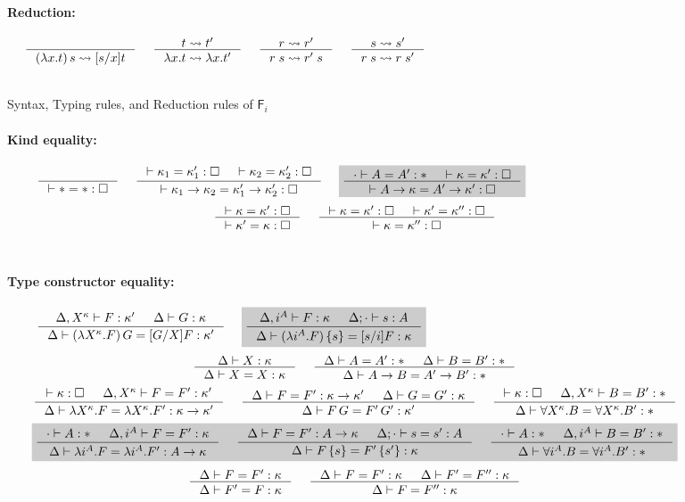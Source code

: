 \documentclass[preprint]{sigplanconf}
\newcommand{\newFi}[1]{\colorbox{grey}{\ensuremath{#1}}}
\newcommand{\Fi}{\ensuremath{\mathsf{F}_i}}
\theoremstyle{plain}
\theoremstyle{remark}
\theoremstyle{definition}
\begin{document}
\begin{figure*}
\paragraph{Reduction:} 
$ 
 ~~~~
   \inference{}{(\lambda x.t)\,s \rightsquigarrow [s/x]t}
 ~~~~
   \inference{t \rightsquigarrow t'}{\lambda x.t \rightsquigarrow \lambda x.t'}
 ~~~~
   \inference{r \rightsquigarrow r'}{r\;s \rightsquigarrow r'\;s}
 ~~~~
   \inference{s \rightsquigarrow s'}{r\;s \rightsquigarrow r\;s'}
$
~\\ ~\\
\caption{Syntax, Typing rules, and Reduction rules of \Fi}
\label{fig:Fi}
\end{figure*}

\begin{figure*}
\paragraph{Kind equality:} 
$ \quad
 ~~~~
   \inference{}{|- * = *:\square}
 ~~~~
   \inference{ |- \kappa_1 = \kappa_1' : \square
             & |- \kappa_2 = \kappa_2' : \square }
             {|- \kappa_1 -> \kappa_2 = \kappa_1' -> \kappa_2' : \square}
 ~~~~ \newFi{
   \inference{\cdot |- A=A':* & |- \kappa=\kappa':\square}
             {|- A -> \kappa = A' -> \kappa' : \square} }
$
\[ \inference{|- \kappa=\kappa':\square}
             {|- \kappa'=\kappa:\square}
 ~~~~
   \inference{ |- \kappa =\kappa' :\square
             & |- \kappa'=\kappa'':\square}
             {|- \kappa=\kappa'':\square}
\]
~\\
\paragraph{Type constructor equality:} 
$ \quad
 ~~~~
   \inference{\Delta,X^\kappa |- F:\kappa' & \Delta |- G:\kappa}
             {\Delta |- (\lambda X^\kappa.F)\,G = [G/X]F:\kappa'}
 ~~~~ \newFi{
   \inference{\Delta,i^A |- F:\kappa & \Delta;\cdot |- s:A}
             {\Delta |- (\lambda i^A.F)\,\{s\} = [s/i]F:\kappa} }
$
\[ \inference{\Delta |- X:\kappa }{\Delta |- X=X:\kappa}
 ~~~~
   \inference{\Delta |- A=A':* & \Delta |- B=B':*}{\Delta |- A-> B=A'-> B':*}
\]
\[ \inference{|- \kappa:\square & \Delta,X^\kappa |- F=F' : \kappa'}
             {\Delta |- \lambda X^\kappa.F=\lambda X^\kappa.F':\kappa-> \kappa'}
 ~~~~
   \inference{\Delta |- F=F':\kappa->\kappa' & \Delta |- G=G':\kappa}
             {\Delta |- F\,G = F'\,G' : \kappa'}
 ~~~~
   \inference{|- \kappa:\square & \Delta,X^\kappa |- B=B':*}
             {\Delta |- \forall X^\kappa.B=\forall X^\kappa.B':*}
\]
\[ \newFi{
   \inference{\cdot |- A:* & \Delta,i^A |- F=F' : \kappa}
             {\Delta |- \lambda i^A.F=\lambda i^A.F' : A -> \kappa}
 ~~~~
   \inference{\Delta |- F=F':A->\kappa & \Delta;\cdot |- s=s':A}
             {\Delta |- F\,\{s\} = F'\,\{s'\} : \kappa}
 ~~~~
   \inference{\cdot |- A:* & \Delta,i^A |- B=B':*}
             {\Delta |- \forall i^A.B=\forall i^A.B':*} }
\]
\[ \inference{\Delta |- F = F' : \kappa}{\Delta |- F' = F : \kappa}
 ~~~~
   \inference{\Delta |- F = F' : \kappa & \Delta |- F' = F'' : \kappa}
             {\Delta |- F = F'' : \kappa}
\]
~\\

\end{figure*}
\end{document}
